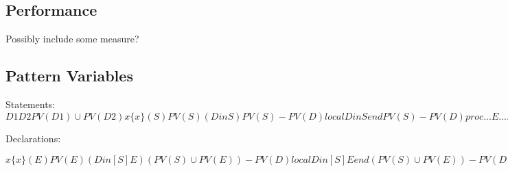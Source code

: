 \documentclass[a4paper]{memoir}
\begin{document}
\section{Performance}
Possibly include some measure?





\begin{appendices} 

  \chapter{Pattern Variables}\label{appendix:patternvariables}
Statements:
$
D1 D2                        PV(D1) \cup PV(D2)
x                            \{x\}
(S)                          PV(S)
(D in S)                     PV(S) - PV(D)
local D in S end             PV(S) - PV(D)
proc ... {E ...} ... end     PV(E)
fun ... {E ...} ... end      PV(E)
class E ... end              PV(E)
functor E ... end            PV(E)
E = ...                      PV(E)
otherwise                    \emptyset
$


Declarations:

$
x                                         \{x\}
(E)                                       PV(E)
(D in [ S ] E)                            (PV(S) \cup PV(E)) - PV(D)
local D in [ S ] E end                    (PV(S) \cup PV(E)) - PV(D)
E1 = E2                                   PV(E1) \cup PV(E2)
[E1 ... En]                               PV(E1) \cup ... \cup PV(En)
E1|E2                                     PV(E1) \cup PV(E2)
E1\#...\#En                                 PV(E1) \cup ... \cup PV(En)
il([ f1: ] E1 ... [ fn: ] En [ ... ])     PV(E1) \cup ... \cup PV(En)
otherwise                                 \emptyset
$
\end{appendices}
\end{document}
